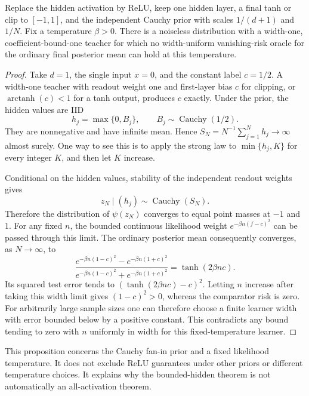 \begin{proposition}\label{prop:relu-obstruction}
Replace the hidden activation by ReLU, keep one hidden layer, a final tanh or clip to $[-1,1]$, and the independent Cauchy prior with scales $1/(d+1)$ and $1/N$. Fix a temperature $\beta>0$. There is a noiseless distribution with a width-one, coefficient-bound-one teacher for which no width-uniform vanishing-risk oracle for the ordinary final posterior mean can hold at this temperature.
\end{proposition}
\begin{proof}
Take $d=1$, the single input $x=0$, and the constant label $c=1/2$. A width-one teacher with readout weight one and first-layer bias $c$ for clipping, or $\operatorname{arctanh}(c)<1$ for a tanh output, produces $c$ exactly. Under the prior, the hidden values are IID
\[
 h_j=\max\{0,B_j\},\qquad B_j\sim\operatorname{Cauchy}(1/2).
\]
They are nonnegative and have infinite mean. Hence $S_N=N^{-1}\sum_{j=1}^Nh_j\to\infty$ almost surely. One way to see this is to apply the strong law to $\min\{h_j,K\}$ for every integer $K$, and then let $K$ increase.

Conditional on the hidden values, stability of the independent readout weights gives
\[
 z_N\mid(h_j)\sim\operatorname{Cauchy}(S_N).
\]
Therefore the distribution of $\psi(z_N)$ converges to equal point masses at $-1$ and $1$. For any fixed $n$, the bounded continuous likelihood weight $e^{-\beta n(f-c)^2}$ can be passed through this limit. The ordinary posterior mean consequently converges, as $N\to\infty$, to
\[
 \frac{e^{-\beta n(1-c)^2}-e^{-\beta n(1+c)^2}}
      {e^{-\beta n(1-c)^2}+e^{-\beta n(1+c)^2}}
 =\tanh(2\beta n c).
\]
Its squared test error tends to $(\tanh(2\beta n c)-c)^2$. Letting $n$ increase after taking this width limit gives $(1-c)^2>0$, whereas the comparator risk is zero. For arbitrarily large sample sizes one can therefore choose a finite learner width with error bounded below by a positive constant. This contradicts any bound tending to zero with $n$ uniformly in width for this fixed-temperature learner.
\end{proof}

This proposition concerns the Cauchy fan-in prior and a fixed likelihood temperature. It does not exclude ReLU guarantees under other priors or different temperature choices. It explains why the bounded-hidden theorem is not automatically an all-activation theorem.
